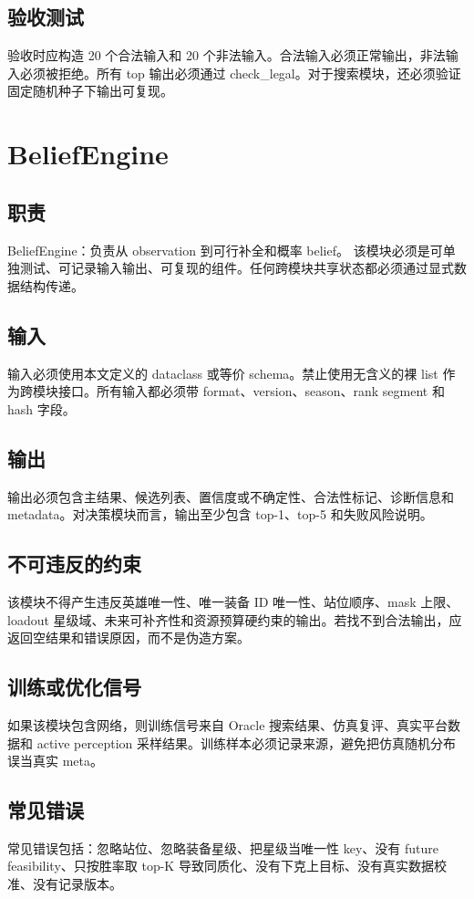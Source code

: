 \documentclass[UTF8,12pt,openany]{ctexbook}
\begin{document}
\subsection{验收测试}
验收时应构造 20 个合法输入和 20 个非法输入。合法输入必须正常输出，非法输入必须被拒绝。所有 top 输出必须通过 check\_legal。对于搜索模块，还必须验证固定随机种子下输出可复现。

\section{BeliefEngine}
\subsection{职责}
BeliefEngine：负责从 observation 到可行补全和概率 belief。 该模块必须是可单独测试、可记录输入输出、可复现的组件。任何跨模块共享状态都必须通过显式数据结构传递。

\subsection{输入}
输入必须使用本文定义的 dataclass 或等价 schema。禁止使用无含义的裸 list 作为跨模块接口。所有输入都必须带 format、version、season、rank segment 和 hash 字段。

\subsection{输出}
输出必须包含主结果、候选列表、置信度或不确定性、合法性标记、诊断信息和 metadata。对决策模块而言，输出至少包含 top-1、top-5 和失败风险说明。

\subsection{不可违反的约束}
该模块不得产生违反英雄唯一性、唯一装备 ID 唯一性、站位顺序、mask 上限、loadout 星级域、未来可补齐性和资源预算硬约束的输出。若找不到合法输出，应返回空结果和错误原因，而不是伪造方案。

\subsection{训练或优化信号}
如果该模块包含网络，则训练信号来自 Oracle 搜索结果、仿真复评、真实平台数据和 active perception 采样结果。训练样本必须记录来源，避免把仿真随机分布误当真实 meta。

\subsection{常见错误}
常见错误包括：忽略站位、忽略装备星级、把星级当唯一性 key、没有 future feasibility、只按胜率取 top-K 导致同质化、没有下克上目标、没有真实数据校准、没有记录版本。
\end{document}
